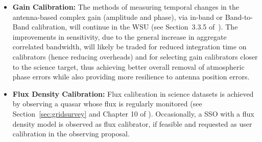 \begin{itemize}[itemsep=-0.5em]
With this limitation, combined with the improved digital efficiency of the WSU, the current moderate-length scans ($5-30$~min, depending on array and frequency band) will be sufficient to achieve the critical \ac{SNR} of 50 in many cases.  In cases where this is not sufficient, automated channel pre-averaging will be invoked  by the Pipeline solver in other cases. Due to differences in spectral resolution, and hence spectral setup, the Pipeline will  apply a bandpass measured from one \ac{spw} to a different \ac{spw}, matching by the baseband name and spectral window number contained in the \ac{spw} name.  For broad \acp{spw} at low frequency, the spectral index across the bandwidth may vary significantly enough to require a more involved treatment in the Pipeline.
\item{\bf Gain Calibration:}
The methods of measuring temporal changes in the antenna-based complex gain (amplitude and phase), via in-band or Band-to-Band calibration, will continue in the WSU (see Section~3.3.5 of~\cite{CSA-IA}). The improvements in sensitivity, due to the general increase in 
aggregate correlated bandwidth, will likely be traded for reduced integration time on calibrators (hence reducing overheads) and for selecting gain calibrators closer to the science target, thus achieving better overall removal of atmospheric phase errors while also providing more resilience to antenna position errors.
\item{\bf Flux Density Calibration:}
Flux calibration in science datasets is achieved by observing a quasar whose flux is regularly monitored (see Section~\ref{sec:gridsurvey} and Chapter 10 of \cite{c12_thb}). Occasionally, a \ac{SSO} with a flux density model is observed as flux calibrator, if feasible and requested as user calibration in the observing proposal.


\end{itemize}
